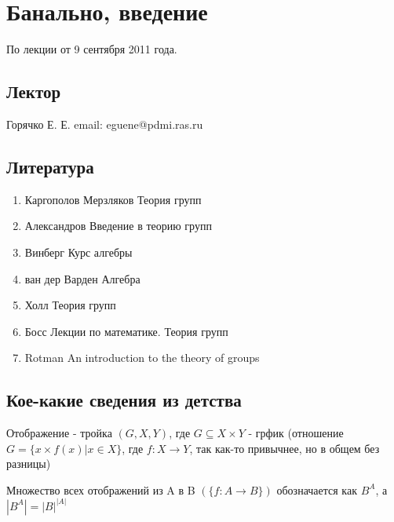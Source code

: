 \chapter{Банально, введение}

По лекции от 9 сентября 2011 года.

\section{Лектор}

Горячко Е. Е. email: eguene@pdmi.ras.ru

\section{Литература}

\begin{enumerate}
\item Каргополов Мерзляков Теория групп

\item Александров Введение в теорию групп

\item Винберг Курс алгебры

\item ван дер Варден Алгебра

\item Холл Теория групп

\item Босс Лекции по математике. Теория групп

\item Rotman An introduction to the theory of groups
\end{enumerate}

\section{Кое-какие сведения из детства}

\begin{Def}
	Отображение - тройка $(G, X, Y)$, где $G \subseteq X \times Y$ - грфик (отношение $G = \{ x \times f(x) | x \in X \}$, где $f : X \rightarrow Y$, так как-то привычнее, но в общем без разницы)
\end{Def}

\begin{Def}
	Множество всех отображений из A в B $\left(\{ f: A \rightarrow B\}\right)$ обозначается как $B^A$, а $\left|B^A\right| = {\left|B\right|}^{\left|A\right|}$
\end{Def}

